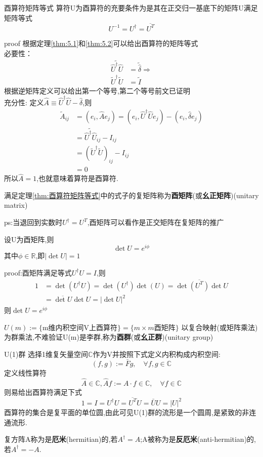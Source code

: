 \documentclass[../main.tex]{subfiles}
\begin{document}
 \begin{theorem}{}{酉算符矩阵等式}
 算符U为酉算符的充要条件为是其在正交归一基底下的矩阵U满足矩阵等式
 $$U^{-1} = U^\dagger = \overline{U^T}$$
 \end{theorem}
 proof 根据定理\ref{thm:5.1}和\ref{thm:5.2}可以给出酉算符的矩阵等式\\
 必要性：
 \begin{align*}
     \widetilde{\hat{U}^\dagger \hat{U}} &= \tilde{\hat{\delta}} \Rightarrow \\
     \tilde{U}^\dagger \tilde{U} &= \tilde{I}
 \end{align*}
 根据逆矩阵定义可以给出第一个等号,第二个等号前文已证明\\
 充分性: 定义$\hat{A}\equiv \hat{U}^\dagger\hat{U} - \hat{\delta}$,则
 \begin{align*}
 \tilde{A}_{ij}&= (e_i,\hat{A}e_j) = (e_i, \hat{U}^\dagger\hat{U}e_j) - (e_i,\hat{\delta}e_j)\\
 &=\widetilde{\hat{U}^\dagger\hat{U}}_{ij} - I_{ij}\\
 &=(\tilde{U}^\dagger\tilde{U})_{ij}- I_{ij}\\
 &= 0
 \end{align*}
 所以$\hat{A} = 1$,也就意味着算符是酉算符.
 \begin{definition}
   满足定理\ref{thm:酉算符矩阵等式}中的式子的复矩阵称为\textbf{酉矩阵}(或\textbf{幺正矩阵})(unitary matrix)  
 \end{definition}
 ps:当退回到实数时$U^\dagger = U^T$,酉矩阵可以看作是正交矩阵在复矩阵的推广

 \begin{theorem}
     设U为酉矩阵,则
     $$\det U = e^{i\phi} $$
     其中$\phi \in \mathbb{R}$,即$|\det U| = 1$
 \end{theorem}
 proof:酉矩阵满足等式$U^\dagger U = I$,则
 \begin{align*}
     1 &= \det(U^\dagger U) = \det(U^\dagger)\det(U) = \det\overline{(U^T)} \det U\\
         &=\overline{\det U}\det U = |\det U|^2
 \end{align*}
 则$\det U = e^{i\phi}$

 \begin{definition}
     $U(m) := \{\text{m维内积空间V上酉算符}\} = \{m\times m \text{酉矩阵}\}$
     以复合映射(或矩阵乘法)为群乘法,不难验证U(m)是李群,称为\textbf{酉群}(或\textbf{幺正群})(unitary group)
 \end{definition}
 \begin{example}{U(1)群}
 \label{ex:G-5-1}
 选择1维复矢量空间$\mathbb{C}$作为V并按照下式定义内积构成内积空间:
 $$(f,g):=\bar{F}g,\quad \forall f,g \in \mathbb{C}$$
 定义线性算符
 $$ \hat{A} \in \mathbb{C}, \hat{A}f:= A\cdot f \in \mathbb{C},\quad \forall f \in \mathbb{C}$$
 则易给出酉算符满足下式
 $$1 = I = U^\dagger U = \overline{U^T}U = \bar{U}{U} = |U|^2$$
 酉算符的集合是复平面的单位圆,由此可见U(1)群的流形是一个圆周,是紧致的非连通流形.
 \end{example}
 \begin{definition}
     复方阵A称为是\textbf{厄米}(hermitian)的,若$A^\dagger = A$;A被称为是\textbf{反厄米}(anti-hermitian)的,若$A^\dagger = -A$.
 \end{definition}
\end{document}
